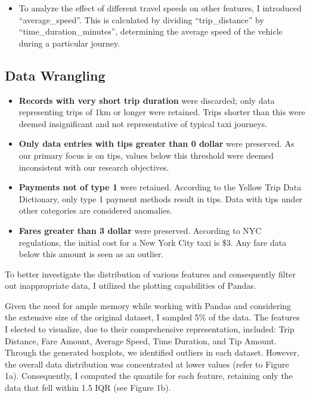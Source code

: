 \documentclass[11pt]{article}
\begin{document}
\begin{itemize} 
    \item To analyze the effect of different travel speeds on other features, I introduced “average\_speed”. This is calculated by dividing “trip\_distance” by “time\_duration\_minutes”, determining the average speed of the vehicle during a particular journey.
\end{itemize}

\subsection{Data Wrangling}
\begin{itemize} 
    \item \textbf{Records with very short trip duration} were discarded; only data representing trips of 1km or longer were retained. Trips shorter than this were deemed insignificant and not representative of typical taxi journeys.
\end{itemize}

\begin{itemize} 
    \item \textbf{Only data entries with tips greater than 0 dollar} were preserved. As our primary focus is on tips, values below this threshold were deemed inconsistent with our research objectives.
\end{itemize}

\begin{itemize} 
    \item \textbf{Payments not of type 1} were retained. According to the Yellow Trip Data Dictionary, only type 1 payment methods result in tips. Data with tips under other categories are considered anomalies.
\end{itemize}

\begin{itemize} 
    \item \textbf{Fares greater than 3 dollar} were preserved. According to NYC regulations, the initial cost for a New York City taxi is \$3. Any fare data below this amount is seen as an outlier.
\end{itemize}


To better investigate the distribution of various features and consequently filter out inappropriate data, I utilized the plotting capabilities of Pandas.

Given the need for ample memory while working with Pandas and considering the extensive size of the original dataset, I sampled 5\% of the data. The features I elected to visualize, due to their comprehensive representation, included: Trip Distance, Fare Amount, Average Speed, Time Duration, and Tip Amount. Through the generated boxplots, we identified outliers in each dataset. However, the overall data distribution was concentrated at lower values (refer to Figure 1a). Consequently, I computed the quantile for each feature, retaining only the data that fell within 1.5 IQR (see Figure 1b).
\end{document}
